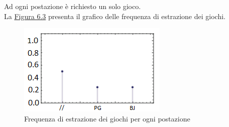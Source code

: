     Ad ogni postazione è richiesto un solo gioco.\\
    La \hyperref[fig63]{Figura 6.3} presenta il grafico delle frequenza di estrazione dei giochi.
    \begin{figure}[!htb]
        \label{fig63}
        \begin{widepage}
            \centering
            \includegraphics[width=.49\textwidth]{../immagini/distr_giochi_tavoli.png}
            \caption{Frequenza di estrazione dei giochi per ogni postazione}
        \end{widepage}
    \end{figure}%
    \clearpage
